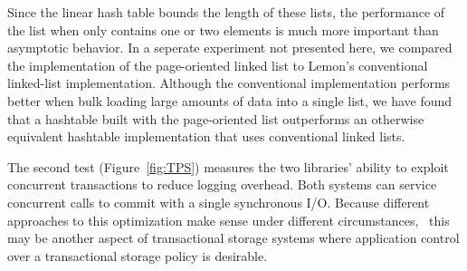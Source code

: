 \documentclass[letterpaper,twocolumn,english]{article}
\newcommand{\yad}{Lemon\xspace}
\begin{document}

Since the linear hash table bounds the length of these lists, the 
performance of the list when only contains one or two elements is
much more important than asymptotic behavior. In a seperate experiment
not presented here, we compared the
implementation of the page-oriented linked list to \yad's conventional
linked-list implementation.  Although the conventional implementation
performs better when bulk loading large amounts of data into a single
list, we have found that a hashtable built with the page-oriented list
outperforms an otherwise equivalent hashtable implementation that uses 
conventional linked lists.




The second test (Figure~\ref{fig:TPS}) measures the two libraries' ability to exploit
concurrent transactions to reduce logging overhead.  Both systems
can service concurrent calls to commit with a single 
synchronous I/O. Because different approaches to this 
optimization make sense under different circumstances,~\cite{findWorkOnThisOrRemoveTheSentence} this may 
be another aspect of transactional storage systems where
application control over a transactional storage policy is desirable.  

\end{document}
